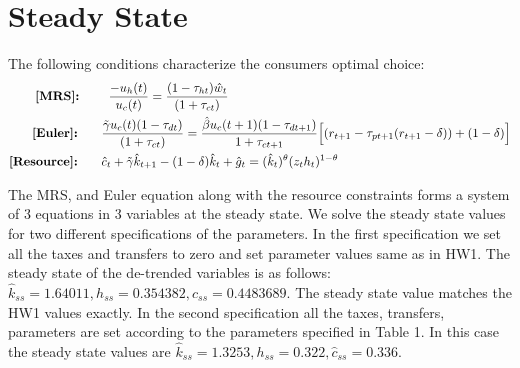 \documentclass[12pt]{article}
\begin{document}
\section{Steady State}
The following conditions characterize the consumers optimal choice:
\begin{align*}
\textbf{[MRS]:     } & \; \; \; \; \; \hspace{2mm}  \frac{-u_h(t)}{u_c(t)} = \frac{(1-\tau_{ht})\hat{w}_t}{(1+\tau_{ct})} \\
\textbf{[Euler]:     } & \; \; \; \; \; \frac{\tilde{\gamma} u_c(t) (1-\tau_{dt})}{(1+\tau_{ct})} = \frac{\hat{\beta} u_c(t+1)(1-\tau_{dt+1})}{1+\tau_{ct+1}}\Big[(r_{t+1} - \tau_{pt+1}(r_{t+1} -\delta)) + (1-\delta) \Big]  \\
\textbf{[Resource]: } & \; \; \; \; \;  \hat{c}_t + \tilde{\gamma} \hat{k}_{t+1} - (1-\delta)\hat{k}_t + \hat{g}_t = (\hat{k}_t)^{\theta}(z_t h_t)^{1-\theta}
\end{align*}

The MRS, and Euler equation along with the resource constraints forms a system of 3 equations in 3 variables at the steady state.
We solve the steady state values for two different specifications of the parameters. In the first specification we set all the taxes and transfers to zero and set parameter values same as in HW1.  The steady state of the de-trended variables is as follows: $\hat{k}_{ss} = 1.64011, h_{ss} = 0.354382, \hat{c}_{ss} = 0.4483689.$  The steady state value matches the HW1 values exactly. In the second specification all the taxes, transfers, parameters are set according to the parameters specified in Table 1. In this case the steady state values are  $\hat{k}_{ss} =  1.3253, h_{ss} = 0.322, \hat{c}_{ss} = 0.336.$
\end{document}
